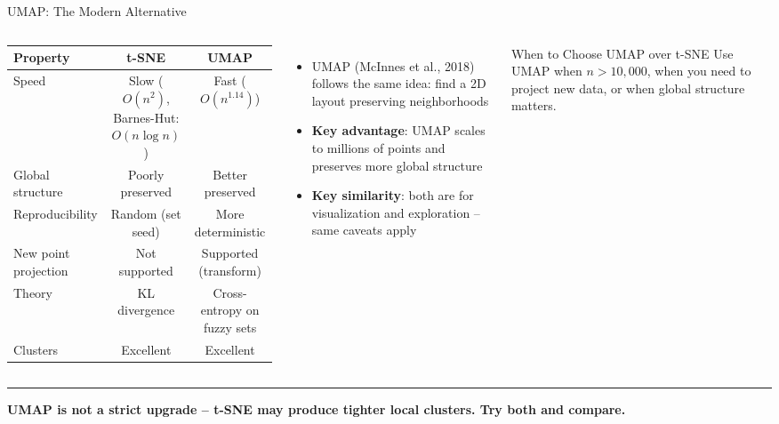 \documentclass[8pt,aspectratio=169]{beamer}
\newcommand{\bottomnote}[1]{%
\vfill
\vspace{-2mm}
\textcolor{mllavender2}{\rule{\textwidth}{0.4pt}}
\vspace{1mm}
\footnotesize
\textbf{#1}
}
\newenvironment{compactlist}{%
  \begin{itemize}%
    \setlength{\itemsep}{2pt}%
    \setlength{\parskip}{0pt}%
    \setlength{\parsep}{0pt}%
}{%
  \end{itemize}%
}
\newcommand{\highlight}[1]{\textcolor{mlorange}{\textbf{#1}}}
\begin{document}
\begin{frame}[t]{UMAP: The Modern Alternative}
\begin{columns}[T]
\small

\vspace{1mm}
\footnotesize
\begin{tabular}{@{}l c c@{}}
\toprule
\textbf{Property} & \textbf{t-SNE} & \textbf{UMAP} \\
\midrule
\rowcolor{mllavender4}
Speed & Slow ($O(n^2)$, Barnes-Hut: $O(n \log n)$) & Fast ($O(n^{1.14})$) \\
Global structure & Poorly preserved & Better preserved \\
\rowcolor{mllavender4}
Reproducibility & Random (set seed) & More deterministic \\
New point projection & Not supported & Supported (transform) \\
\rowcolor{mllavender4}
Theory & KL divergence & Cross-entropy on fuzzy sets \\
Clusters & Excellent & Excellent \\
\bottomrule
\end{tabular}

\vspace{3mm}
\begin{compactlist}
\item UMAP (McInnes et al., 2018) follows the same idea: find a 2D layout preserving neighborhoods
\item \highlight{Key advantage}: UMAP scales to millions of points and preserves more global structure
\item \highlight{Key similarity}: both are for visualization and exploration -- same caveats apply
\end{compactlist}

\begin{block}{When to Choose UMAP over t-SNE}
\scriptsize Use UMAP when $n > 10{,}000$, when you need to project new data, or when global structure matters.
\end{block}
\end{columns}

\bottomnote{UMAP is not a strict upgrade -- t-SNE may produce tighter local clusters. Try both and compare.}
\end{frame}
\end{document}
